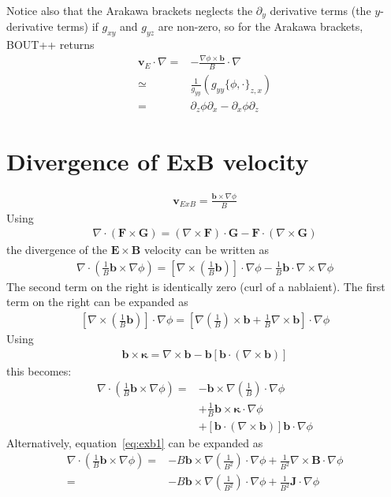 \documentclass[12pt]{article}
\def\L{\left}
\def\R{\right}
\newcommand{\ve}[1]{\ensuremath{\boldsymbol{#1}}}
\begin{document}
Notice also that the Arakawa brackets neglects the $\partial_y$ derivative
terms (the $y$-derivative terms) if $g_{xy}$ and $g_{yz}$ are non-zero, so for
the Arakawa brackets, BOUT++ returns
%
\begin{align*}
    \ve{v}_E\cdot\nabla =& -\frac{\nabla\phi\times\ve{b}}{B}\cdot\nabla\\
    \simeq& \frac{1}{g_{yy}} \L( g_{yy}\{\phi, \cdot\}_{z,x} \R)\\
    =& \partial_z\phi\partial_x - \partial_x\phi\partial_z
\end{align*}
%





\section{Divergence of ExB velocity}
%
\begin{align*}
\ve{v}_{ExB} = \frac{\ve{b}\times\nabla\phi}{B}
\end{align*}
%
Using
%
\begin{align*}
\nabla\cdot\L(\ve{F}\times\ve{G}\R) = \L(\nabla\times\ve{F}\R)\cdot\ve{G} -
\ve{F}\cdot\L(\nabla\times\ve{G}\R)
\end{align*}
%
the divergence of the $\ve{E}\times\ve{B}$ velocity can be written as
%
\begin{align}
\nabla\cdot\L(\frac{1}{B}\ve{b}\times\nabla\phi\R) =
\L[\nabla\times\L(\frac{1}{B}\ve{b}\R)\R]\cdot\nabla\phi -
\frac{1}{B}\ve{b}\cdot\nabla\times\nabla\phi
\label{eq:exb1}
\end{align}
%
The second term on the right is identically zero (curl of a nablaient). The
first term on the right can be expanded as
%
\begin{align*}
\L[\nabla\times\L(\frac{1}{B}\ve{b}\R)\R]\cdot\nabla\phi =
\L[\nabla\L(\frac{1}{B}\R)\times\ve{b} +
\frac{1}{B}\nabla\times\ve{b}\R]\cdot\nabla\phi
\end{align*}
%
Using
%
\begin{align*}
\ve{b}\times\ve{\kappa} = \nabla\times\ve{b} -
\ve{b}\L[\ve{b}\cdot\L(\nabla\times\ve{b}\R)\R]
\end{align*}
%
this becomes:
%
\begin{align*}
  \nabla\cdot\L(\frac{1}{B}\ve{b}\times\nabla\phi\R) =
  &-\ve{b}\times\nabla\L(\frac{1}{B}\R)\cdot\nabla\phi \\ &+
  \frac{1}{B}\ve{b}\times\ve{\kappa}\cdot\nabla\phi \\ &+
  \L[\ve{b}\cdot\L(\nabla\times\ve{b}\R)\R]\ve{b}\cdot\nabla\phi
\end{align*}
%
Alternatively, equation~\ref{eq:exb1} can be expanded as
%
\begin{align*}
  \nabla\cdot\L(\frac{1}{B}\ve{b}\times\nabla\phi\R) =&
    -B\ve{b}\times\nabla\L(\frac{1}{B^2}\R)\cdot\nabla\phi +
    \frac{1}{B^2}\nabla\times\ve{B}\cdot\nabla\phi \\ =&
    -B\ve{b}\times\nabla\L(\frac{1}{B^2}\R)\cdot\nabla\phi +
    \frac{1}{B^2}\ve{J}\cdot\nabla\phi
\end{align*}
%
\end{document}
